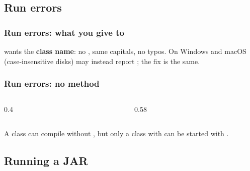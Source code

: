 \documentclass[aspectratio=169,10pt,compress]{beamer}
\begin{document}
\subsection[Run errors]{Run errors}




\begin{frame}[t,fragile] \frametitle{Run errors: what you give to }

  \vspace{0.1em}
  \small
   wants the \textbf{class name}: no , same capitals, no typos. On Windows and macOS (case-insensitive disks)
   may instead report ; the fix is the same.
\end{frame}




\begin{frame}[t,fragile] \frametitle{Run errors: no  method}
  \begin{columns}[T]
    \begin{column}{0.4\textwidth}
    \end{column}
    \begin{column}{0.58\textwidth}
    \end{column}
  \end{columns}

  \vspace{0.1em}
  \small A class can compile without , but only a class with
   can be started with .
\end{frame}


\subsection[Run jar]{Running a JAR}
\end{document}
